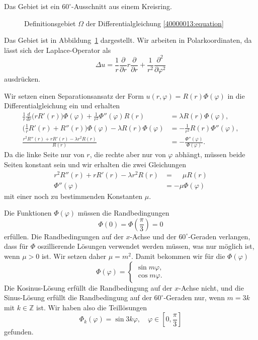 \begin{loesung}
Das Gebiet ist ein $60^\circ$-Ausschnitt aus einem Kreisring.

\begin{figure}
\centering
{}
\caption{Definitionsgebiet $\Omega$ der Differentialgleichung
\eqref{40000013:equation}
\label{40000013:gebiet}
}
\end{figure}
Das Gebiet ist in Abbildung~\ref{40000013:gebiet} dargestellt.
Wir arbeiten in Polarkoordinaten, da lässt sich der Laplace-Operator als
\[
\Delta u
=
\frac1r\frac{\partial}{\partial r}r\frac{\partial}{\partial r}
+
\frac1{r^2}
\frac{\partial^2}{\partial\varphi^2}
\]
ausdrücken.
\begin{teilaufgaben}
\item
Wir setzen einen Separationsansatz der Form $u(r,\varphi)=R(r)\Phi(\varphi)$
in die Differentialgleichung ein und erhalten
\begin{align*}
\frac1r\frac{d}{dr}\bigl(rR'(r)\bigr)\Phi(\varphi)
+
\frac1{r^2}
\Phi''(\varphi)R(r)
&=
\lambda R(r)\Phi(\varphi),
\\
\biggl(\frac1rR'(r)+R''(r)\biggr)\Phi(\varphi)
- \lambda R(r)\Phi(\varphi)
&=
-
\frac1{r^2}
R(r)\Phi''(\varphi),
\\
\frac{r^2R''(r)+rR'(r)-\lambda r^2 R(r)}{R(r)}
&=
-\frac{\Phi''(\varphi)}{\Phi(\varphi)}.
\end{align*}
Da die linke Seite nur von $r$, die rechte aber nur von $\varphi$ abhängt,
müssen beide Seiten konstant sein und wir
erhalten die zwei Gleichungen
\begin{align}
r^2R''(r)+rR'(r)-\lambda r^2 R(r)&=\phantom{-}\mu R(r)
\label{40000013:erste}
\\
\Phi''(\varphi)&=-\mu\Phi(\varphi)
\label{40000013:zweite}
\end{align}
mit einer noch zu bestimmenden Konstanten $\mu$.
\item
Die Funktionen $\Phi(\varphi)$ müssen die Randbedingungen
\[
\Phi(0)=\Phi({\textstyle\frac{\pi}3})=0
\]
erfüllen.
Die Randbedingungen auf der $x$-Achse und der $60^\circ$-Geraden verlangen,
dass für $\Phi$
oszillierende Lösungen verwendet werden müssen, was nur möglich ist,
wenn $\mu>0$ ist. Wir setzen daher $\mu=m^2$. Damit bekommen wir für die
$\Phi(\varphi)$
\[
\Phi(\varphi)=\begin{cases}\sin m\varphi,\\\cos m\varphi.\end{cases}
\]
Die Kosinus-Lösung erfüllt die Randbedingung auf der $x$-Achse nicht,
und die Sinus-Lösung erfüllt die Randbedingung auf der $60^\circ$-Geraden nur,
wenn $m=3k$ mit $k\in\mathbb Z$ ist.
Wir haben also die Teillösungen
\[
\Phi_k(\varphi)=\sin 3k\varphi, \quad\varphi\in[0,{\textstyle \frac{\pi}3}]
\]
gefunden.


\end{teilaufgaben}
\end{loesung}
